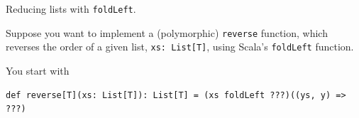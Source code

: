 \begin{questions}

\bigskip

\question[9] Reducing lists with \texttt{foldLeft}.

Suppose you want to implement a (polymorphic) \texttt{reverse} function, which reverses the order of a given list, \texttt{xs: List[T]}, using Scala's \texttt{foldLeft} function.

You start with

\begin{verbatim}
def reverse[T](xs: List[T]): List[T] = (xs foldLeft ???)((ys, y) => ???)
\end{verbatim}

\end{questions}
